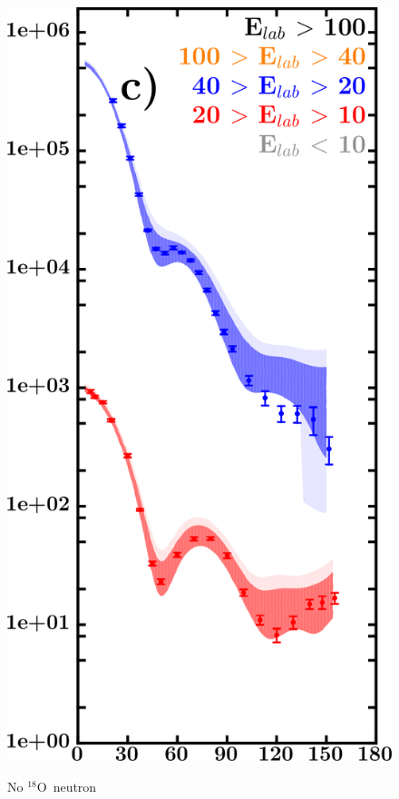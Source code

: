 \documentclass[twocolumn,secnumarabic,amssymb, nobibnotes, aps, prl,
superscriptaddress, nobalancelastpage, draft]{revtex4}
\newcommand{\oEight}{\ensuremath{^{18}}O}
\begin{document}
\begin{figure}[!htb]
\begin{minipage}{0.4\linewidth}
\begin{minipage}[c]{0.5\linewidth}
                \includegraphics[width=\linewidth]{figures/o18_neutronElastic.png}
        \end{minipage}
        \begin{minipage}[c]{0.45\linewidth}
            \centering
            No \oEight\ neutron \\

\end{minipage}
\end{minipage}
\end{figure}
\end{document}
